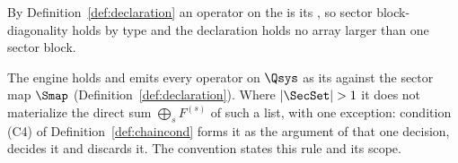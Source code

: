 
By Definition~\ref{def:declaration} an operator on the  is its
, so sector block-diagonality holds by type and the declaration
holds no array larger than one sector block.

\begin{requirement}\label{req:operator-form}
The engine holds and emits every operator on $\Qsys$ as its
 against the sector map $\Smap$
(Definition~\ref{def:declaration}). Where $|\SecSet|>1$ it does not
materialize the direct sum $\bigoplus_sF^{(s)}$ of such a list, with one
exception: condition (C4) of Definition~\ref{def:chaincond} forms it as the
argument of that one decision, decides it and discards it. The convention
 states this rule and its scope.
\end{requirement}
